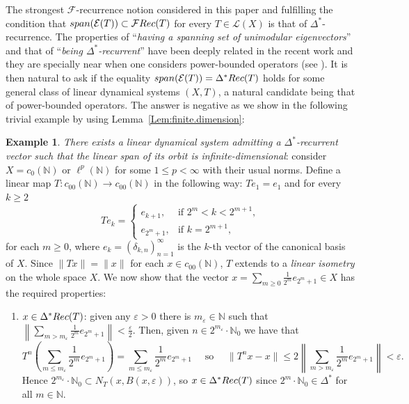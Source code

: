 \documentclass[openright,11pt]{article}
\theoremstyle{plain}
\theoremstyle{definition}
\newtheorem{example}[theorem]{Example}
\newcommand{\NN}{\mathbb{N}}
\newcommand{\Del}{\Delta}
\newcommand{\Ec}{\mathcal{E}}
\newcommand{\Fc}{\mathcal{F}}
\newcommand{\Lc}{\mathcal{L}}
\newcommand{\Rec}{\textup{Rec}}
\newcommand{\lspan}{\textup{span}}
\newcommand{\eps}{\varepsilon}
\newcommand{\del}{\delta}
\begin{document}
The strongest $\Fc$-recurrence notion considered in this paper and fulfilling the condition that $\lspan(\Ec(T)) \subset \Fc\Rec(T)$ for every $T \in \Lc(X)$ is that of $\Del^*$-recurrence. The properties of ``{\em having a spanning set of unimodular eigenvectors}'' and that of ``{\em being $\Delta^*$-recurrent}'' have been deeply related in the recent work \cite{GriLo2023} and they are specially near when one considers power-bounded operators (see \cite[Theorem~1.9]{GriLo2023}). It is then natural to ask if the equality $\lspan(\Ec(T)) = \Del^*\Rec(T)$ holds for some general class of linear dynamical systems $(X,T)$, a natural candidate being that of power-bounded operators. The answer is negative as we show in the following trivial example by using Lemma~\ref{Lem:finite.dimension}:

\begin{example}
	{\em There exists a linear dynamical system admitting a $\Del^*$-recurrent vector such that the linear span of its orbit is infinite-dimensional}: consider $X=c_0(\NN)$ or $\ell^p(\NN)$ for some $1\leq p<\infty$ with their usual norms. Define a linear map $T:c_{00}(\NN)\longrightarrow c_{00}(\NN)$ in the following way: $Te_1=e_1$ and for every $k\geq 2$
	\begin{equation*}
		Te_k =  \begin{cases}
					e_{k+1}, & \text{if } 2^m < k < 2^{m+1}, \\
					e_{2^m+1}, & \text{if } k=2^{m+1},
				\end{cases}
	\end{equation*}
	for each $m\geq 0$, where $e_k=(\del_{k,n})_{n=1}^{\infty}$ is the $k$-th vector of the canonical basis of $X$. Since $\|Tx\| = \|x\|$ for each $x \in c_{00}(\NN)$, $T$ extends to a {\em linear isometry} on the whole space $X$. We now show that the vector $x = \sum_{m\geq 0} \frac{1}{2^m} e_{2^m+1} \in X$ has the required properties:
	\begin{enumerate}[1)]
		\item $x \in \Del^*\Rec(T)$: given any $\eps>0$ there is $m_{\eps} \in \NN$ such that $\left\| \sum_{m > m_{\eps}} \frac{1}{2^m}e_{2^m+1} \right\| < \frac{\eps}{2}$. Then, given $n \in 2^{m_{\eps}}\cdot\NN_0$ we have that
		\[
		T^n\left( \sum_{m \leq m_{\eps}} \frac{1}{2^m}e_{2^m+1} \right) = \sum_{m \leq m_{\eps}} \frac{1}{2^m}e_{2^m+1} \quad \text{ so } \quad \|T^nx - x\| \leq 2 \left\| \sum_{m > m_{\eps}} \frac{1}{2^m}e_{2^m+1} \right\| < \eps.
		\] %
		Hence $2^{m_{\eps}}\cdot\NN_0 \subset N_T(x,B(x,\eps))$, so $x \in \Del^*\Rec(T)$ since $2^{m}\cdot\NN_0 \in \Del^*$ for all $m\in\NN$.
		

\end{enumerate}
\end{example}
\end{document}
